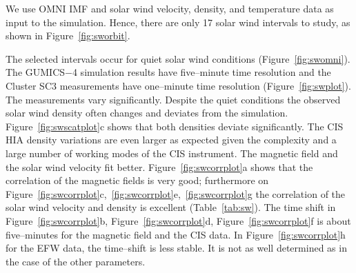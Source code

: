 \documentclass[b5paper,10pt]{article}
\begin{document}
We use OMNI IMF and solar wind velocity, density, and temperature data as input to the simulation. %
Hence, there are only 17 solar wind intervals to study, as shown in Figure~\ref{fig:sworbit}. 

The selected intervals occur for quiet solar wind conditions (Figure~\ref{fig:swomni}). The GUMICS$-$4 simulation results have five--minute time resolution and the Cluster SC3 measurements have one--minute time resolution (Figure~\ref{fig:swplot}). The measurements vary significantly. Despite the quiet conditions the observed solar wind density often changes and deviates from the simulation. Figure~\ref{fig:swscatplot}c shows that both densities deviate significantly. The CIS HIA density variations are even larger as expected given the complexity and a large number of working modes of the CIS instrument. The magnetic field and the solar wind velocity fit better. Figure~\ref{fig:swcorrplot}a shows that the correlation of the magnetic fields is very good; furthermore on Figure~\ref{fig:swcorrplot}c,~\ref{fig:swcorrplot}e,~\ref{fig:swcorrplot}g the correlation of the solar wind velocity and density is excellent (Table~\ref{tab:sw}). The time shift in Figure~\ref{fig:swcorrplot}b, Figure~\ref{fig:swcorrplot}d, Figure~\ref{fig:swcorrplot}f is about five--minutes for the magnetic field and the CIS data. In Figure~\ref{fig:swcorrplot}h for the EFW data, the time--shift is less stable. It is not as well determined as in the case of the other parameters.
\end{document}
